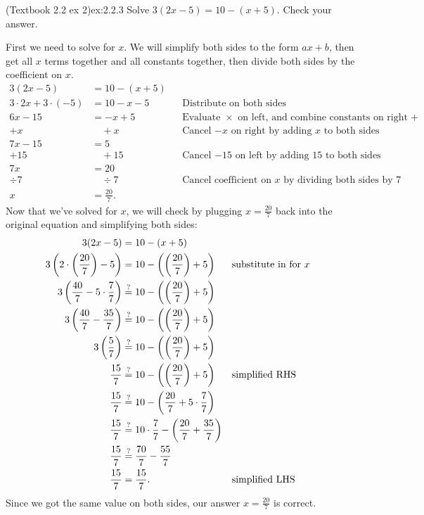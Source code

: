 \documentclass{article}
\begin{document}
\begin{example}{(Textbook 2.2 ex 2)}{ex:2.2.3}
    Solve $3(2x-5)=10-(x+5)$. Check your answer.
\end{example}
\begin{solution}
    First we need to solve for $x$. We will simplify both sides to the form $ax+b$, then get all $x$ terms together and all constants together, then divide both sides by the coefficient on $x$.
    \begin{align*}
        3(2x-5)&=10-(x+5)\\
        3\cdot 2x + 3 \cdot (-5) &= 10 -x -5 && \text{Distribute on both sides} \\
        6x-15 &= -x + 5 && \text{Evaluate $\times$ on left, and combine constants on right with $+$} \\
        +x \phantom{-15} &\quad +x && \text{Cancel $-x$ on right by adding $x$ to both sides}\\
        7x - 15 & = 5\\
        +15 &\quad +15 && \text{Cancel $-15$ on left by adding $15$ to both sides}\\
        7x &= 20\\
        \div 7 &\quad \div 7 && \text{Cancel coefficient on $x$ by dividing both sides by $7$}\\
        x &=\frac{20}{7}.
    \end{align*}
    Now that we've solved for $x$, we will check by plugging $x=\frac{20}{7}$ back into the original equation and simplifying both sides:
    \begin{align*}
        3(2x-5)&=10-(x+5)\\
        3\left(2\cdot\left(\frac{20}{7}\right) - 5\right)&=10-\left(\left(\frac{20}{7}\right)+5\right) && \text{substitute in for $x$}\\
        3\left(\frac{40}{7}-5\cdot\frac{7}{7}\right)&\stackrel{?}{=}10-\left(\left(\frac{20}{7}\right)+5\right)\\
        3\left(\frac{40}{7}-\frac{35}{7}\right)&\stackrel{?}{=}10-\left(\left(\frac{20}{7}\right)+5\right)\\
        3\left(\frac{5}{7}\right)&\stackrel{?}{=}10-\left(\left(\frac{20}{7}\right)+5\right)\\
        \frac{15}{7}&\stackrel{?}{=}10-\left(\left(\frac{20}{7}\right)+5\right) && \text{simplified RHS}\\
        \frac{15}{7}&\stackrel{?}{=}10-\left(\frac{20}{7}+5\cdot\frac{7}{7}\right)\\
        \frac{15}{7}&\stackrel{?}{=}10\cdot\frac{7}{7}-\left(\frac{20}{7}+\frac{35}{7}\right)\\
        \frac{15}{7}&\stackrel{?}{=}\frac{70}{7}-\frac{55}{7}\\
        \frac{15}{7}&=\frac{15}{7}. && \text{simplified LHS}
    \end{align*}
    Since we got the same value on both sides, our answer $x=\frac{20}{7}$ is correct.
\end{solution}
\end{document}
